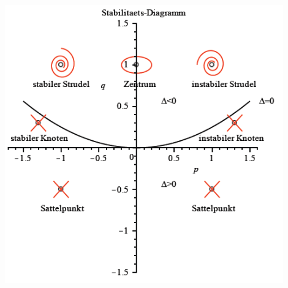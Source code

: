 \begin{minipage}[h]{0.35\textwidth} 
	\includegraphics[width=0.9\textwidth]{images/StabilitaetsDiagramm.png}
\end{minipage}
